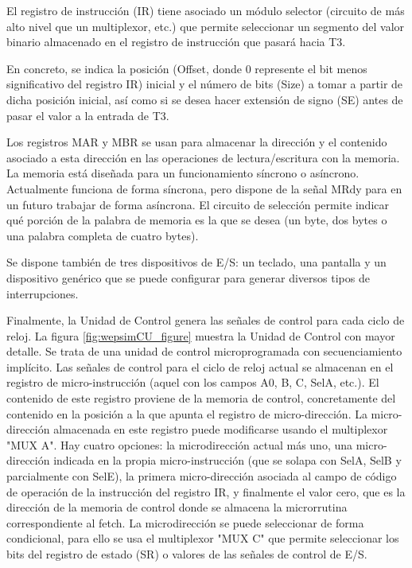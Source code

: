 El registro de instrucción (IR) tiene asociado un módulo selector (circuito de  más alto nivel que un multiplexor, etc.) que permite seleccionar un segmento del valor binario almacenado en el registro de instrucción que pasará hacia T3.

En concreto, se indica la posición (Offset, donde 0 represente el bit menos significativo del registro IR) inicial y el número de bits (Size) a tomar a partir de dicha posición inicial, así como si se desea hacer extensión de signo (SE) antes de pasar el valor a la entrada de T3.

Los registros MAR y MBR se usan para almacenar la dirección y el contenido asociado a esta dirección en las operaciones de lectura/escritura con la memoria. La memoria está diseñada para un funcionamiento síncrono o asíncrono. Actualmente funciona de forma síncrona, pero dispone de la señal MRdy para en un futuro trabajar de forma asíncrona. El circuito de selección permite indicar qué porción de la palabra de memoria es la que se desea (un byte, dos bytes o una palabra completa de cuatro bytes).

Se dispone también de tres dispositivos de E/S: un teclado, una pantalla y un dispositivo genérico que se puede configurar para generar diversos tipos de interrupciones.

Finalmente, la Unidad de Control genera las señales de control para cada ciclo de reloj. La figura \ref{fig:wepsimCU_figure} muestra la Unidad de Control con mayor detalle. Se trata de una unidad de control microprogramada con secuenciamiento implícito. Las señales de control para el ciclo de reloj actual se almacenan en el registro de micro-instrucción (aquel con los campos A0, B, C, SelA, etc.). El contenido de este registro proviene de la memoria de control, concretamente del contenido en la posición a la que apunta el registro de micro-dirección. La micro-dirección almacenada en este registro puede modificarse usando el multiplexor "MUX A". Hay cuatro opciones: la microdirección actual más uno, una micro-dirección indicada en la propia micro-instrucción (que se solapa con SelA, SelB y parcialmente con SelE), la primera micro-dirección asociada al campo de código de operación de la instrucción del registro IR, y finalmente el valor cero, que es la dirección de la memoria de control donde se almacena la microrrutina correspondiente al fetch. La microdirección se puede seleccionar de forma condicional, para ello se usa el multiplexor "MUX C" que permite seleccionar los bits del registro de estado (SR) o valores de las señales de control de E/S.

